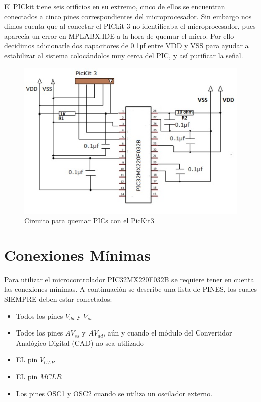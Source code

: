 \documentclass[12pt,letterpaper,twoside]{book}
\begin{document}
El PICkit tiene seis orificios en su extremo, cinco de ellos se encuentran conectados a  cinco pines correspondientes del microprocesador.
Sin embargo nos dimos cuenta que al conectar el PICkit 3 no identificaba el microprocesador, pues aparecía un error en MPLABX.IDE  a la hora de quemar el micro. Por ello decidimos adicionarle dos  capacitores de 0.1µf entre VDD y VSS para ayudar a estabilizar al sistema colocándolos muy cerca del PIC, y así purificar la señal.  

\begin{figure}
\centering
\includegraphics[width=5in]{Quemador.jpg}
\caption{Circuito para quemar PICs con el PicKit3}
\label{fig4}
\end{figure}

\section{Conexiones Mínimas}

Para utilizar el microcontrolador PIC32MX220F032B se requiere tener en cuenta las conexiones mínimas. A continuación se describe una lista de PINES, los cuales SIEMPRE deben estar conectados:

\begin{itemize}
\item Todos los pines $V_{dd}$ y $V_{ss}$
\item Todos los pines $AV_{ss}$ y $AV_{dd}$, aún y cuando el módulo del Convertidor Analógico Digital (CAD) no sea utilizado
\item EL pin $V_{CAP}$
\item EL pin $\overline{MCLR}$
\item Los pines OSC1 y OSC2 cuando se utiliza un oscilador externo.
\end{itemize}
\end{document}
